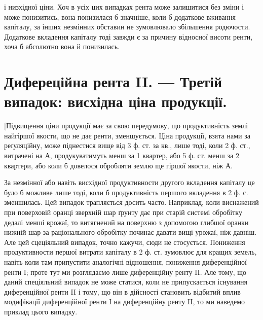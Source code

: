\parcont{}  %
і низхідної ціни. Хоч в усіх цих випадках рента може залишитися без зміни
і може понизитись, вона понизилася б значніше, коли б додаткове вживання
капіталу, за інших незмінних обставин не зумовлювало збільшення родючости. Додаткове вкладення
капіталу тоді завжди є за причину відносної висоти ренти,
хоча б абсолютно вона й понизилась.

\section{Дифереційна рента II. — Третій випадок:
висхідна ціна продукції.}

[Підвищення ціни продукції має за свою передумову, що продуктивність землі
найгіршої якости, що не дає ренти, зменшується. Ціна продукції, взята нами за
реґуляційну, може піднестися вище від 3 ф. ст. за кв., лише тоді, коли 2 ф. ст.,
витрачені на А, продукуватимуть менш за 1 квартер, або 5 ф. ст. менш за
2 квартери, або коли б довелося обробляти землю ще гіршої якости, ніж А.

За незмінної або навіть висхідної продуктивности другого вкладення капіталу
це було б можливе лише тоді, коли б продуктивність першого вкладення в 2 ф. с.
зменшилась. Цей випадок трапляється досить часто. Наприклад, коли виснажений
при поверховій оранці зверхній шар ґрунту дає при старій системі обробітку
дедалі менші врожаї, то витягнений на поверхню з допомогою глибшої
оранки нижній шар за раціонального обробітку починає давати вищі
урожаї, ніж давніш. Але цей сцеціяльний випадок, точно кажучи, сюди не
стосується. Пониження продуктивности першої витрати капіталу в 2 ф. ст. зумовлює для кращих
земель, навіть коли там припустити аналогічні відношення,
пониження диференційної ренти І; проте тут ми розглядаємо лише диференційну
ренту II. Але тому, що даний спеціяльний випадок не може статися, коли не
припускається існування диференційної ренти II і тому, що він в дійсності
становить відбитий вплив модифікації диференційної ренти І на диференційну
ренту II, то ми наведемо приклад цього випадку.

